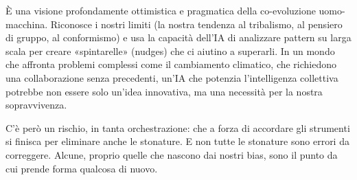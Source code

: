 È una visione profondamente ottimistica e pragmatica della co-evoluzione uomo-macchina. Riconosce i nostri limiti (la nostra tendenza al tribalismo, al pensiero di gruppo, al conformismo) e usa la capacità dell'IA di analizzare pattern su larga scala per creare «spintarelle» (nudges) che ci aiutino a superarli. In un mondo che affronta problemi complessi come il cambiamento climatico, che richiedono una collaborazione senza precedenti, un'IA che potenzia l'intelligenza collettiva potrebbe non essere solo un'idea innovativa, ma una necessità per la nostra sopravvivenza.

C'è però un rischio, in tanta orchestrazione: che a forza di accordare gli strumenti si finisca per eliminare anche le stonature. E non tutte le stonature sono errori da correggere. Alcune, proprio quelle che nascono dai nostri bias, sono il punto da cui prende forma qualcosa di nuovo.  